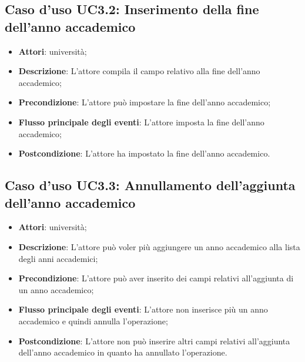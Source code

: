 \subsection{Caso d'uso \texorpdfstring{UC3.2}{UC3.2}: Inserimento della fine dell'anno accademico}
\begin{itemize}
\item \textbf{Attori}: università;
\item \textbf{Descrizione}: L'attore compila il campo relativo alla fine dell'anno accademico;
\item \textbf{Precondizione}: L'attore può impostare la fine dell'anno accademico;
\item \textbf{Flusso principale degli eventi}: L'attore imposta la fine dell'anno accademico;
\item \textbf{Postcondizione}: L'attore ha impostato la fine dell'anno accademico.
\end{itemize}
\subsection{Caso d'uso \texorpdfstring{UC3.3}{UC3.3}: Annullamento dell'aggiunta dell'anno accademico}
\begin{itemize}
\item \textbf{Attori}: università;
\item \textbf{Descrizione}: L'attore può voler più aggiungere un anno accademico alla lista degli anni accademici;
\item \textbf{Precondizione}: L'attore può aver inserito dei campi relativi all'aggiunta di un anno accademico;
\item \textbf{Flusso principale degli eventi}: L'attore non inserisce più un anno accademico e quindi annulla l'operazione;
\item \textbf{Postcondizione}: L'attore non può inserire altri campi relativi all'aggiunta dell'anno accademico in quanto ha annullato l'operazione.
\end{itemize}
